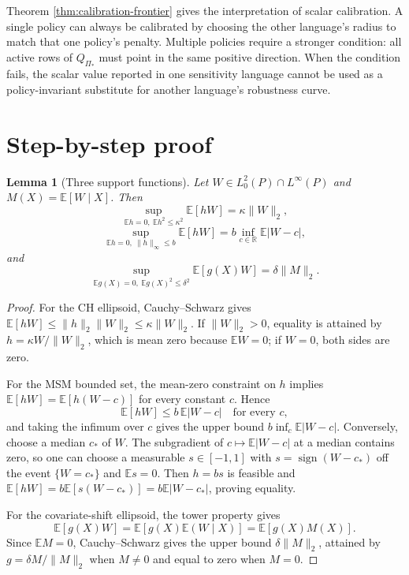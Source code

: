 \documentclass[11pt]{article}
\newcommand{\E}{\mathbb{E}}
\newcommand{\R}{\mathbb{R}}
\theoremstyle{definition}
\theoremstyle{plain}
\newtheorem{lemma}{Lemma}
\theoremstyle{remark}
\begin{document}
Theorem \ref{thm:calibration-frontier} gives the interpretation of scalar calibration.
A single policy can always be calibrated by choosing the other language's radius to
match that one policy's penalty.  Multiple policies require a stronger condition:
all active rows of $Q_{\Pi_\ast}$ must point in the same positive direction.  When the
condition fails, the scalar value reported in one sensitivity language cannot be used
as a policy-invariant substitute for another language's robustness curve.

\section{Step-by-step proof}
\begin{lemma}[Three support functions]\label{lem:support-functions}
Let $W\in L^2_0(P)\cap L^\infty(P)$ and $M(X)=\E[W\mid X]$.  Then
\[
  \sup_{\E h=0,\ \E h^2\le\kappa^2}\E[hW]=\kappa\|W\|_2,
\]
\[
  \sup_{\E h=0,\ \|h\|_\infty\le b}\E[hW]=b\inf_{c\in\R}\E|W-c|,
\]
and
\[
  \sup_{\E g(X)=0,\ \E g(X)^2\le\delta^2}\E[g(X)W]=\delta\|M\|_2.
\]
\end{lemma}

\begin{proof}
For the CH ellipsoid, Cauchy--Schwarz gives
$\E[hW]\le \|h\|_2\|W\|_2\le\kappa\|W\|_2$.  If $\|W\|_2>0$, equality is attained by
$h=\kappa W/\|W\|_2$, which is mean zero because $\E W=0$; if $W=0$, both sides are
zero.

For the MSM bounded set, the mean-zero constraint on $h$ implies
$\E[hW]=\E[h(W-c)]$ for every constant $c$.  Hence
\[
  \E[hW]\le b\,\E|W-c|
  \quad\text{for every }c,
\]
and taking the infimum over $c$ gives the upper bound
$b\inf_c\E|W-c|$.  Conversely, choose a median $c_\ast$ of $W$.  The subgradient of
$c\mapsto\E|W-c|$ at a median contains zero, so one can choose a measurable
$s\in[-1,1]$ with $s=\operatorname{sign}(W-c_\ast)$ off the event
$\{W=c_\ast\}$ and $\E s=0$.  Then $h=bs$ is feasible and
$\E[hW]=b\E[s(W-c_\ast)]=b\E|W-c_\ast|$, proving equality.

For the covariate-shift ellipsoid, the tower property gives
\[
  \E[g(X)W]=\E[g(X)\E(W\mid X)]=\E[g(X)M(X)].
\]
Since $\E M=0$, Cauchy--Schwarz gives the upper bound
$\delta\|M\|_2$, attained by $g=\delta M/\|M\|_2$ when $M\ne0$ and equal to zero
when $M=0$.
\end{proof}
\end{document}
